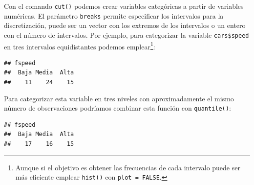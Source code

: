 \documentclass[]{book}
\newenvironment{Shaded}{\begin{snugshade}}{\end{snugshade}}
\newcommand{\KeywordTok}[1]{\textcolor[rgb]{0.13,0.29,0.53}{\textbf{#1}}}
\newcommand{\DataTypeTok}[1]{\textcolor[rgb]{0.13,0.29,0.53}{#1}}
\newcommand{\DecValTok}[1]{\textcolor[rgb]{0.00,0.00,0.81}{#1}}
\newcommand{\StringTok}[1]{\textcolor[rgb]{0.31,0.60,0.02}{#1}}
\newcommand{\OperatorTok}[1]{\textcolor[rgb]{0.81,0.36,0.00}{\textbf{#1}}}
\newcommand{\NormalTok}[1]{#1}
\begin{document}
Con el comando \texttt{cut()} podemos crear variables categóricas a
partir de variables numéricas. El parámetro \texttt{breaks} permite
especificar los intervalos para la discretización, puede ser un vector
con los extremos de los intervalos o un entero con el número de
intervalos. Por ejemplo, para categorizar la variable
\texttt{cars\$speed} en tres intervalos equidistantes podemos
emplear\footnote{Aunque si el objetivo es obtener las frecuencias de
  cada intervalo puede ser más eficiente emplear \texttt{hist()} con
  \texttt{plot\ =\ FALSE}.}:

\begin{Shaded}
\end{Shaded}

\begin{verbatim}
## fspeed
##  Baja Media  Alta 
##    11    24    15
\end{verbatim}

Para categorizar esta variable en tres niveles con aproximadamente el
mismo número de observaciones podríamos combinar esta función con
\texttt{quantile()}:

\begin{Shaded}
\end{Shaded}

\begin{verbatim}
## fspeed
##  Baja Media  Alta 
##    17    16    15
\end{verbatim}
\end{document}
